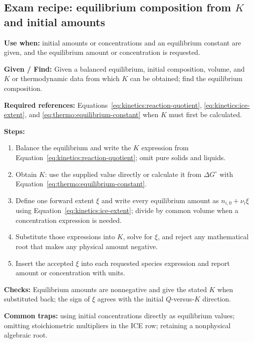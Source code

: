 \subsection{Exam recipe: equilibrium composition from \(K\) and initial amounts}
\textbf{Use when:} initial amounts or concentrations and an equilibrium constant are given, and the equilibrium amount or concentration is requested.

\textbf{Given / Find:} Given a balanced equilibrium, initial composition, volume, and \(K\) or thermodynamic data from which \(K\) can be obtained; find the equilibrium composition.

\textbf{Required references:} Equations~\eqref{eq:kinetics:reaction-quotient}, \eqref{eq:kinetics:ice-extent}, and \eqref{eq:thermo:equilibrium-constant} when \(K\) must first be calculated.


\textbf{Steps:}
\begin{enumerate}
    \item Balance the equilibrium and write the \(K\) expression from Equation~\eqref{eq:kinetics:reaction-quotient}; omit pure solids and liquids.
    \item Obtain \(K\): use the supplied value directly or calculate it from \(\Delta G^\circ\) with Equation~\eqref{eq:thermo:equilibrium-constant}.
    \item Define one forward extent \(\xi\) and write every equilibrium amount as \(n_{i,0}+\nu_i\xi\) using Equation~\eqref{eq:kinetics:ice-extent}; divide by common volume when a concentration expression is needed.
    \item Substitute those expressions into \(K\), solve for \(\xi\), and reject any mathematical root that makes any physical amount negative.
    \item Insert the accepted \(\xi\) into each requested species expression and report amount or concentration with units.
\end{enumerate}

\textbf{Checks:} Equilibrium amounts are nonnegative and give the stated \(K\) when substituted back; the sign of \(\xi\) agrees with the initial \(Q\)-versus-\(K\) direction.

\textbf{Common traps:} using initial concentrations directly as equilibrium values; omitting stoichiometric multipliers in the ICE row; retaining a nonphysical algebraic root.
